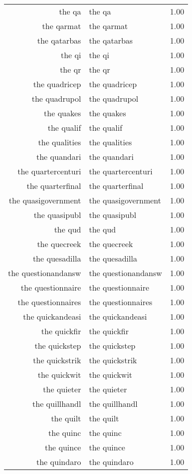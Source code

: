 \begin{table}[ht]
\begin{tabular}{rlr}
  the qa & the qa & 1.00 \\ 
  the qarmat & the qarmat & 1.00 \\ 
  the qatarbas & the qatarbas & 1.00 \\ 
  the qi & the qi & 1.00 \\ 
  the qr & the qr & 1.00 \\ 
  the quadricep & the quadricep & 1.00 \\ 
  the quadrupol & the quadrupol & 1.00 \\ 
  the quakes & the quakes & 1.00 \\ 
  the qualif & the qualif & 1.00 \\ 
  the qualities & the qualities & 1.00 \\ 
  the quandari & the quandari & 1.00 \\ 
  the quartercenturi & the quartercenturi & 1.00 \\ 
  the quarterfinal & the quarterfinal & 1.00 \\ 
  the quasigovernment & the quasigovernment & 1.00 \\ 
  the quasipubl & the quasipubl & 1.00 \\ 
  the qud & the qud & 1.00 \\ 
  the quecreek & the quecreek & 1.00 \\ 
  the quesadilla & the quesadilla & 1.00 \\ 
  the questionandansw & the questionandansw & 1.00 \\ 
  the questionnaire & the questionnaire & 1.00 \\ 
  the questionnaires & the questionnaires & 1.00 \\ 
  the quickandeasi & the quickandeasi & 1.00 \\ 
  the quickfir & the quickfir & 1.00 \\ 
  the quickstep & the quickstep & 1.00 \\ 
  the quickstrik & the quickstrik & 1.00 \\ 
  the quickwit & the quickwit & 1.00 \\ 
  the quieter & the quieter & 1.00 \\ 
  the quillhandl & the quillhandl & 1.00 \\ 
  the quilt & the quilt & 1.00 \\ 
  the quinc & the quinc & 1.00 \\ 
  the quince & the quince & 1.00 \\ 
  the quindaro & the quindaro & 1.00 \\ 

\end{tabular}
\end{table}
